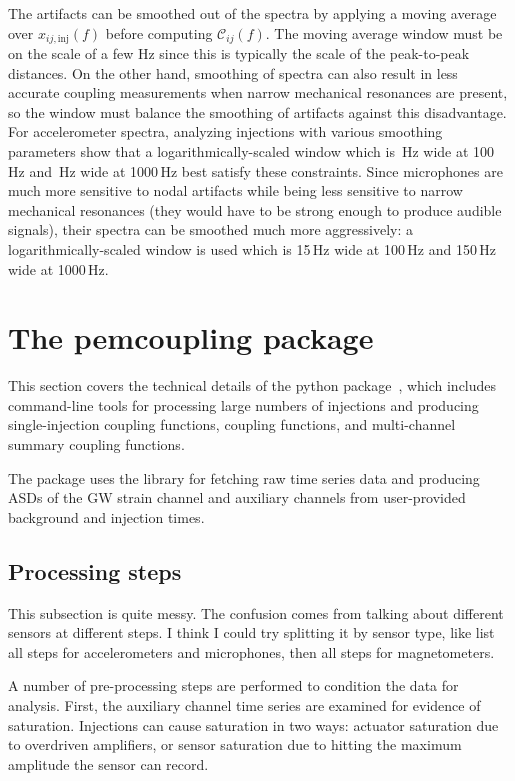 The artifacts can be smoothed out of the spectra by applying a moving average over $x_{ij,\mathrm{inj}}(f)$ before computing $\mathcal{C}_{ij}(f)$.
The moving average window must be on the scale of a few Hz since this is typically the scale of the peak-to-peak distances.
On the other hand, smoothing of spectra can also result in less accurate coupling measurements when narrow mechanical resonances are present, so the window must balance the smoothing of artifacts against this disadvantage.
For accelerometer spectra, analyzing injections with various smoothing parameters show that a logarithmically-scaled window which is \XX\,Hz wide at 100\,Hz and \XX\,Hz wide at 1000\,Hz best satisfy these constraints.
Since microphones are much more sensitive to nodal artifacts while being less sensitive to narrow mechanical resonances (they would have to be strong enough to produce audible signals), their spectra can be smoothed much more aggressively: a logarithmically-scaled window is used which is 15\,Hz wide at 100\,Hz and 150\,Hz wide at 1000\,Hz.

\section{The {\selectfont pemcoupling}\xspace package}
\label{sec:pemcoupling}

This section covers the technical details of the \pemcoupling python package~\citep{pem_code}, which includes command-line tools for processing large numbers of injections and producing single-injection coupling functions, coupling functions, and multi-channel summary coupling functions.

The package uses the  library for fetching raw time series data and producing \acp{ASD} of the \ac{GW} strain channel and auxiliary channels from user-provided background and injection times.

\subsection{Processing steps}

{\color{red}
This subsection is quite messy.
The confusion comes from talking about different sensors at different steps.
I think I could try splitting it by sensor type, like list all steps for accelerometers and microphones, then all steps for magnetometers.}

A number of pre-processing steps are performed to condition the data for analysis.
First, the auxiliary channel time series are examined for evidence of saturation.
Injections can cause saturation in two ways: actuator saturation due to overdriven amplifiers, or sensor saturation due to hitting the maximum amplitude the sensor can record.

